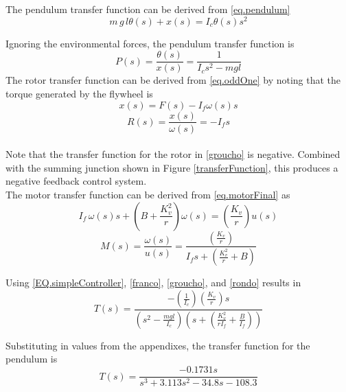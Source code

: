 \documentclass[12pt,letterpaper]{article}
\begin{document}
The pendulum transfer function can be derived from \eqref{eq.pendulum}
%
\begin{equation}
    m \,g \,l \theta(s) + x(s) = I_{c}\theta(s) s^{2}
\end{equation}

Ignoring the environmental forces, the pendulum transfer function is 
\begin{equation}
    P(s) = \frac{\theta(s)}{x(s)}= \frac{1}{I_{c} s^{2} - m g l }
    \label{franco}
\end{equation}
%
The rotor transfer function can be derived from \eqref{eq.oddOne} by noting that the torque generated by the flywheel is
\begin{equation}
    x(s) = F(s) - I_{f}\omega(s) s
\end{equation}
%
\begin{equation}
    R(s) = \frac{x(s)}{\omega(s)} = -I_{f} s
    \label{groucho}
\end{equation}\\

Note that the transfer function for the rotor in \eqref{groucho} is negative.  Combined with the summing
junction shown in Figure \ref{transferFunction}, this produces a negative feedback control system.\\
 


The motor transfer function can be derived from \eqref{eq.motorFinal} as
\begin{equation}
    I_{f} \, \omega(s) s + \left( B+\frac{K_{v}^2}{r} \right) \omega(s) = \left(\frac{K_{v}} {r}\right)u(s)
\end{equation}
%
\begin{equation}
    M(s) = \frac{\omega(s)}{u(s)} =  \frac{\left(\frac{K_{v}} {r}\right)}{I_{f} s + (\frac{K_{v}^2}{r}+B)}
    \label{rondo}
\end{equation} 

Using \eqref{EQ.simpleController}, \eqref{franco}, \eqref{groucho}, and \eqref{rondo} results in 
%
\begin{equation}
	T(s) =\frac{-(\frac{1} {I_{c}})(\frac{K_{v}}{r})s}
	{(s^2-\frac{m g l}{I_{c}})(s+(\frac{K_{v}^2}{r I_{f}}+\frac{B}{I_{f}}))}
\end{equation}

Substituting in values from the appendixes, the transfer function for the pendulum is
\begin{equation}
	T(s) =\frac{-0.1731 s}{s^3 + 3.113 s^2 -34.8 s -108.3}
\end{equation}
\end{document}
